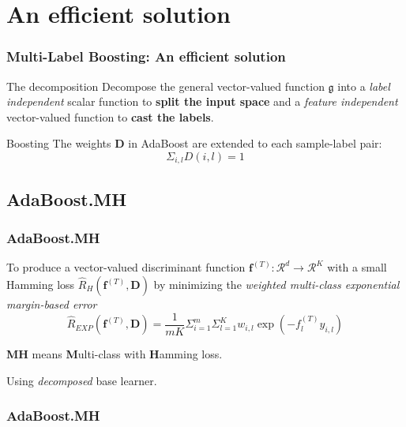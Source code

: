 \documentclass{beamer}
\begin{document}
\section{An efficient solution}

\begin{frame}
\frametitle{Multi-Label Boosting: An efficient solution}
\begin{block}{The decomposition}
  Decompose the general vector-valued function $\mathfrak{g}$ into a \textit{label independent} scalar function to \textbf{split the input space} and a \textit{feature independent} vector-valued function to \textbf{cast the labels}.
\end{block}

\begin{block}{Boosting}
The weights $\mathbf{D}$ in AdaBoost are extended to each sample-label pair:
$${\Sigma}_{i,l} D(i, l) = 1$$
\end{block}

\end{frame}

\subsection{AdaBoost.MH}

\begin{frame}
\frametitle{AdaBoost.MH}
To produce a vector-valued discriminant function $\mathbf{f}^{(T)} : \mathcal{R}^d \rightarrow \mathcal{R}^K$ with a small Hamming loss $\hat{R}_H (\mathbf{f}^{(T)}, \mathbf{D})$ by minimizing the \textit{weighted multi-class exponential margin-based error}
$$\hat{R}_{EXP}(\mathbf{f}^{(T)}, \mathbf{D}) = \frac{1}{mK} {{\Sigma}_{i=1}^m} {{\Sigma}_{l=1}^K} {w_{i,l}\exp(- f_l^{(T)} y_{i,l})}$$

\begin{block}{}
\textbf{MH} means \textbf{M}ulti-class with \textbf{H}amming loss.
\end{block}

\begin{block}{}
Using \textit{decomposed} base learner.
\end{block}
\end{frame}

\begin{frame}
\frametitle{AdaBoost.MH}
\begin{algorithm}[H]
\end{algorithm}
\end{frame}
\end{document}
